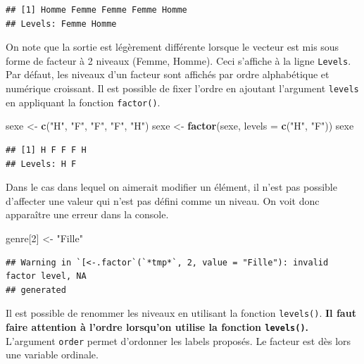 \documentclass[
]{book}
\newenvironment{Shaded}{\begin{snugshade}}{\end{snugshade}}
\newcommand{\AttributeTok}[1]{\textcolor[rgb]{0.13,0.29,0.53}{#1}}
\newcommand{\DecValTok}[1]{\textcolor[rgb]{0.00,0.00,0.81}{#1}}
\newcommand{\FunctionTok}[1]{\textcolor[rgb]{0.13,0.29,0.53}{\textbf{#1}}}
\newcommand{\NormalTok}[1]{#1}
\newcommand{\OtherTok}[1]{\textcolor[rgb]{0.56,0.35,0.01}{#1}}
\newcommand{\StringTok}[1]{\textcolor[rgb]{0.31,0.60,0.02}{#1}}
\begin{document}
\begin{verbatim}
## [1] Homme Femme Femme Femme Homme
## Levels: Femme Homme
\end{verbatim}

On note que la sortie est légèrement différente lorsque le vecteur est mis sous forme de facteur à 2 niveaux (Femme, Homme). Ceci s'affiche à la ligne \texttt{Levels}. Par défaut, les niveaux d'un facteur sont affichés par ordre alphabétique et numérique croissant. Il est possible de fixer l'ordre en ajoutant l'argument \texttt{levels} en appliquant la fonction \texttt{factor()}.

\begin{Shaded}
\begin{Highlighting}[]
\NormalTok{sexe }\OtherTok{\textless{}{-}} \FunctionTok{c}\NormalTok{(}\StringTok{"H"}\NormalTok{, }\StringTok{"F"}\NormalTok{, }\StringTok{"F"}\NormalTok{, }\StringTok{"F"}\NormalTok{, }\StringTok{"H"}\NormalTok{)}
\NormalTok{sexe }\OtherTok{\textless{}{-}} \FunctionTok{factor}\NormalTok{(sexe, }\AttributeTok{levels =} \FunctionTok{c}\NormalTok{(}\StringTok{"H"}\NormalTok{, }\StringTok{"F"}\NormalTok{))}
\NormalTok{sexe}
\end{Highlighting}
\end{Shaded}

\begin{verbatim}
## [1] H F F F H
## Levels: H F
\end{verbatim}

Dans le cas dans lequel on aimerait modifier un élément, il n'est pas possible d'affecter une valeur qui n'est pas défini comme un niveau. On voit donc apparaître une erreur dans la console.

\begin{Shaded}
\begin{Highlighting}[]
\NormalTok{genre[}\DecValTok{2}\NormalTok{] }\OtherTok{\textless{}{-}} \StringTok{"Fille"}
\end{Highlighting}
\end{Shaded}

\begin{verbatim}
## Warning in `[<-.factor`(`*tmp*`, 2, value = "Fille"): invalid factor level, NA
## generated
\end{verbatim}

Il est possible de renommer les niveaux en utilisant la fonction \texttt{levels()}. \textbf{Il faut faire attention à l'ordre lorsqu'on utilise la fonction \texttt{levels()}.} L'argument \texttt{order} permet d'ordonner les labels proposés. Le facteur est dès lors une variable ordinale.
\end{document}
